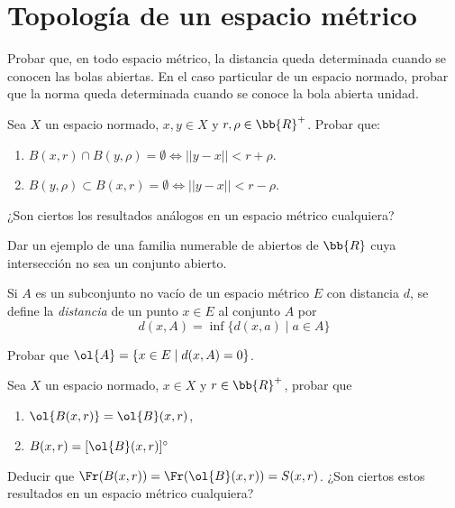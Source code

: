 \section{Topología de un espacio métrico}


\begin{ejercicio}
    Probar que, en todo espacio métrico, la distancia queda determinada cuando se conocen las bolas abiertas. En el caso particular de un espacio normado, probar que la norma queda determinada cuando se conoce la bola abierta unidad.
\end{ejercicio}


\begin{ejercicio}
    Sea $X$ un espacio normado, $x,y\in X$ y $r,\rho\in \bb{R}^+$. Probar que:
    \begin{enumerate}
        \item $B(x,r)\cap B(y,\rho)=\emptyset \Longleftrightarrow ||y-x|| <r+\rho$.
        \item $B(y,\rho)\subset B(x,r)=\emptyset \Longleftrightarrow ||y-x|| <r-\rho$.
    \end{enumerate}

    ¿Son ciertos los resultados análogos en un espacio métrico cualquiera?
\end{ejercicio}


\begin{ejercicio}
    Dar un ejemplo de una familia numerable de abiertos de $\bb{R}$ cuya intersección no sea un conjunto abierto.
\end{ejercicio}

\begin{ejercicio}
    Si $A$ es un subconjunto no vacío de un espacio métrico $E$ con distancia $d$, se define la \emph{distancia} de un punto $x\in E$ al conjunto $A$ por
    $$d(x,A) = \inf\{ d(x,a) \mid a \in A\}$$

    Probar que $ \ol{A} = \{x \in E \mid d(x,A) = 0\}$.
\end{ejercicio}


\begin{ejercicio}
    Sea $X$ un espacio normado, $x \in X$ y $r \in \bb{R}^+$, probar que
    \begin{enumerate}
        \item $\ol{B(x,r)} = \ol{B}(x,r)$,
        \item $B(x,r) = [\ol{B}(x,r)]^\circ$
    \end{enumerate}

    Deducir que $\Fr(B(x,r)) = \Fr(\ol{B}(x,r)) = S(x, r)$. ¿Son ciertos estos resultados en un espacio métrico cualquiera?
\end{ejercicio}

